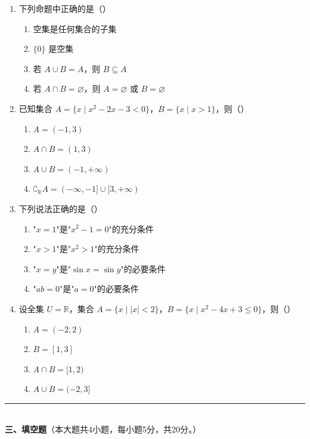 \documentclass[12pt, a4paper]{ctexart}
\begin{document}
\begin{enumerate}[resume]
\item 下列命题中正确的是（\quad）
  \begin{enumerate}[label=\Alph*., itemsep=0pt]
    \item 空集是任何集合的子集
    \item $\{0\}$ 是空集
    \item 若 $A\cup B=A$，则 $B\subseteq A$
    \item 若 $A\cap B=\varnothing$，则 $A=\varnothing$ 或 $B=\varnothing$
  \end{enumerate}

\item 已知集合 $A=\{x\mid x^2-2x-3<0\}$，$B=\{x\mid x>1\}$，则（\quad）
  \begin{enumerate}[label=\Alph*., itemsep=0pt]
    \item $A=(-1,3)$ \quad \item $A\cap B=(1,3)$
    \item $A\cup B=(-1,+\infty)$ \quad \item $\complement_{\mathbb{R}}A=(-\infty,-1]\cup[3,+\infty)$
  \end{enumerate}

\item 下列说法正确的是（\quad）
  \begin{enumerate}[label=\Alph*., itemsep=0pt]
    \item "$x=1$"是"$x^2-1=0$"的充分条件
    \item "$x>1$"是"$x^2>1$"的充分条件
    \item "$x=y$"是"$\sin x=\sin y$"的必要条件
    \item "$ab=0$"是"$a=0$"的必要条件
  \end{enumerate}

\item 设全集 $U=\mathbb{R}$，集合 $A=\{x\mid |x|<2\}$，$B=\{x\mid x^2-4x+3\leq 0\}$，则（\quad）
  \begin{enumerate}[label=\Alph*., itemsep=0pt]
    \item $A=(-2,2)$ \quad \item $B=[1,3]$
    \item $A\cap B=[1,2)$ \quad \item $A\cup B=(-2,3]$
  \end{enumerate}
\end{enumerate}

\vspace{6pt}

\noindent\rule{\textwidth}{0.4pt}\\[2pt]
{\large\bfseries 三、填空题}（本大题共4小题，每小题5分，共20分。）
\end{document}
